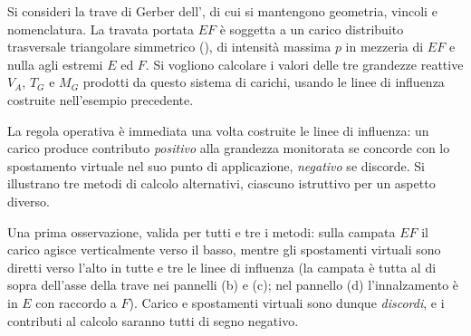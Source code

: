 \begin{esempio}
	\label{subsec:gerber_carico_triangolare}
	
	Si consideri la trave di Gerber dell',
	di cui si mantengono geometria, vincoli e nomenclatura. La 
	travata portata $EF$ è soggetta a un carico distribuito
	trasversale triangolare simmetrico
	(), di intensità massima 
	$p$ in mezzeria di $EF$ e nulla agli estremi $E$ ed $F$.
	Si vogliono calcolare i valori delle tre grandezze reattive
	$V_A$, $T_G$ e $M_G$ prodotti da questo sistema di carichi,
	usando le linee di influenza costruite nell'esempio
	precedente.
	
	\begin{svolgimento}
		
		La regola operativa è immediata una volta costruite le 
		linee di influenza: un carico produce contributo
		\emph{positivo} alla grandezza monitorata se concorde con
		lo spostamento virtuale nel suo punto di applicazione,
		\emph{negativo} se discorde. Si illustrano tre metodi di
		calcolo alternativi, ciascuno istruttivo per un aspetto
		diverso.
		
		Una prima osservazione, valida per tutti e tre i metodi:
		sulla campata $EF$ il carico agisce verticalmente verso
		il basso, mentre gli spostamenti virtuali sono diretti
		verso l'alto in tutte e tre le linee di influenza (la
		campata è tutta al di sopra dell'asse della trave nei
		pannelli (b) e (c); nel pannello (d) l'innalzamento è in
		$E$ con raccordo a $F$). Carico e spostamenti virtuali
		sono dunque \emph{discordi}, e i contributi al calcolo
		saranno tutti di segno negativo.
		

\end{svolgimento}
\end{esempio}
